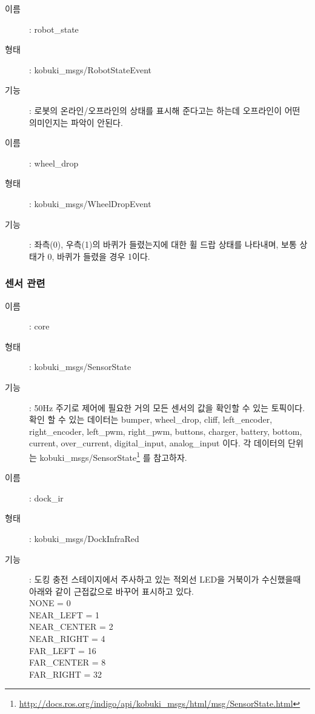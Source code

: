 \vspace{\baselineskip}
\begin{description}
\item[이름]: robot\_state
\item[형태]: kobuki\_msgs/RobotStateEvent
\item[기능]: 로봇의 온라인/오프라인의 상태를 표시해 준다고는 하는데 오프라인이 어떤 의미인지는 파악이 안된다.
\end{description}

\vspace{\baselineskip}
\begin{description}
\item[이름]: wheel\_drop
\item[형태]: kobuki\_msgs/WheelDropEvent
\item[기능]: 좌측(0), 우측(1)의 바퀴가 들렸는지에 대한 휠 드랍 상태를 나타내며, 보통 상태가 0, 바퀴가 들렸을 경우 1이다. 
\end{description}

\subsubsection{센서 관련}

\vspace{\baselineskip}
\begin{description}
\item[이름]: core
\item[형태]: kobuki\_msgs/SensorState
\item[기능]: 50Hz 주기로 제어에 필요한 거의 모든 센서의 값을 확인할 수 있는 토픽이다. 확인 할 수 있는 데이터는 bumper, wheel\_drop, cliff, left\_encoder, right\_encoder, left\_pwm, right\_pwm, buttons, charger, battery, bottom, current, over\_current, digital\_input, analog\_input 이다. 각 데이터의 단위는 kobuki\_msgs/SensorState\footnote{\url{http://docs.ros.org/indigo/api/kobuki_msgs/html/msg/SensorState.html}} 를 참고하자. 
\end{description}

\vspace{\baselineskip}
\begin{description}
\item[이름]: dock\_ir
\item[형태]: kobuki\_msgs/DockInfraRed
\item[기능]: 도킹 충전 스테이지에서 주사하고 있는 적외선 LED을 거북이가 수신했을때 아래와 같이 근접값으로 바꾸어 표시하고 있다.\\
NONE  =  0\\
NEAR\_LEFT =  1\\
NEAR\_CENTER =  2\\
NEAR\_RIGHT =  4\\
FAR\_LEFT = 16\\
FAR\_CENTER  =  8\\
FAR\_RIGHT = 32
\end{description}

